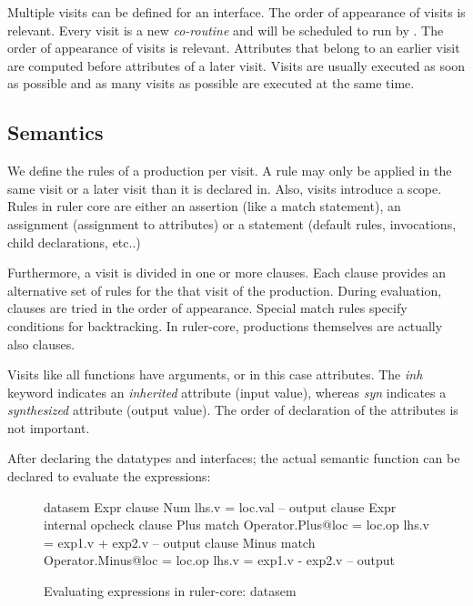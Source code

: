 Multiple visits can be defined for an interface. The order of appearance of visits is relevant. Every visit is a new \emph{co-routine} and will be scheduled to run by \rcore. The order of appearance of visits is relevant. Attributes that belong to an earlier visit are computed before attributes of a later visit. Visits are usually executed as soon as possible and as many visits as possible are executed at the same time. %

\subsection{Semantics}
We define the rules of a production per visit. A rule may only be applied in the same visit or a later visit than it is declared in. Also, visits introduce a scope.
Rules in ruler core are either an assertion (like a match statement), an assignment (assignment to attributes) or a statement (default rules, invocations, child declarations, etc..)

Furthermore, a visit is divided in one or more clauses. Each clause provides an alternative set of rules for the that visit of the production. During evaluation, clauses are tried in the order of appearance. Special match rules specify conditions for backtracking.
In ruler-core, productions themselves are actually also clauses.

Visits like all functions have arguments, or in this case attributes. The \emph{inh} keyword indicates an \emph{inherited} attribute (input value), whereas \emph{syn} indicates a \emph{synthesized} attribute (output value). The order of declaration of the attributes is not important.

After declaring the datatypes and interfaces; the actual semantic function can be declared to evaluate the expressions:

\begin{figure}[H]
\begin{code}
datasem Expr
   clause Num
     lhs.v = loc.val -- output
   clause Expr
     internal opcheck
       clause Plus
         match Operator.Plus@loc = loc.op
         lhs.v = exp1.v + exp2.v -- output
       clause Minus
         match Operator.Minus@loc = loc.op
         lhs.v = exp1.v - exp2.v -- output
\end{code}
\caption{Evaluating expressions in ruler-core: datasem}
\label{example:tutorial1:datasem}
\end{figure}

